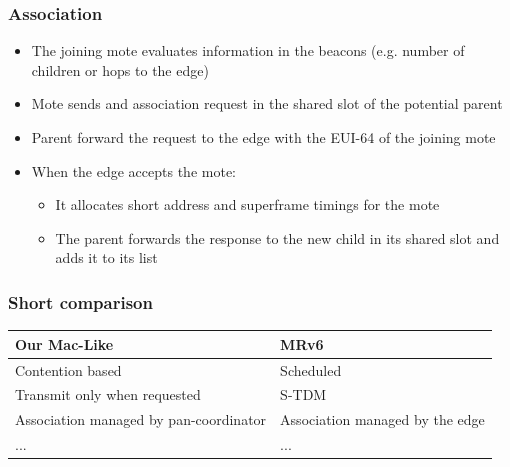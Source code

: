 \begin{frame}[fragile]
  \frametitle{Association}
  \begin{itemize}
    \item The joining mote evaluates information in the beacons (e.g. number of children or hops to the edge)
    \item Mote sends and association request in the shared slot of the potential parent
    \item Parent forward the request to the edge with the EUI-64 of the joining mote
    \item When the edge accepts the mote:
    \begin{itemize}
      \item It allocates short address and superframe timings for the mote
      \item The parent forwards the response to the new child in its shared slot and adds it to its list
    \end{itemize}
  \end{itemize}
\end{frame}

\begin{frame}[fragile]
 \frametitle{Short comparison}
 \begin{table}[h]
    \begin{tabular}{@{}p{5cm}|p{5cm}@{}}
      \toprule
      Our Mac-Like &  MRv6 \\ \midrule
      Contention based &  Scheduled\\
      \hline
      Transmit only when  \mbox{requested} &  S-TDM\\
      \hline
      Association managed by pan-coordinator & Association managed by the edge  \\ 
      ... & ... \\ \bottomrule
    \end{tabular}
  \end{table}
\end{frame}
